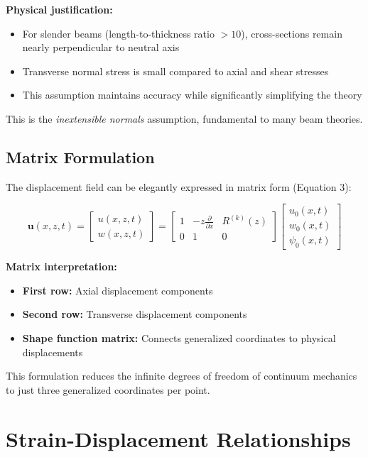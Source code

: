 \documentclass[12pt,a4paper]{article}
\begin{document}
\textbf{Physical justification:}
\begin{itemize}
\item For slender beams (length-to-thickness ratio $> 10$), cross-sections remain nearly perpendicular to neutral axis
\item Transverse normal stress is small compared to axial and shear stresses
\item This assumption maintains accuracy while significantly simplifying the theory
\end{itemize}

This is the \textit{inextensible normals} assumption, fundamental to many beam theories.

\subsection{Matrix Formulation}

The displacement field can be elegantly expressed in matrix form (Equation 3):

\begin{equation}
\mathbf{u}(x,z,t) =
\begin{bmatrix}
u(x,z,t) \\
w(x,z,t)
\end{bmatrix}
=
\begin{bmatrix}
1 & -z\frac{\partial }{\partial x} & R^{(k)}(z) \\
0 & 1 & 0
\end{bmatrix}
\begin{bmatrix}
u_0(x,t) \\
w_0(x,t) \\
\psi_0(x,t)
\end{bmatrix}
\end{equation}

\textbf{Matrix interpretation:}
\begin{itemize}
\item \textbf{First row:} Axial displacement components
\item \textbf{Second row:} Transverse displacement components
\item \textbf{Shape function matrix:} Connects generalized coordinates to physical displacements
\end{itemize}

This formulation reduces the infinite degrees of freedom of continuum mechanics to just three generalized coordinates per point.

\section{Strain-Displacement Relationships}
\end{document}

